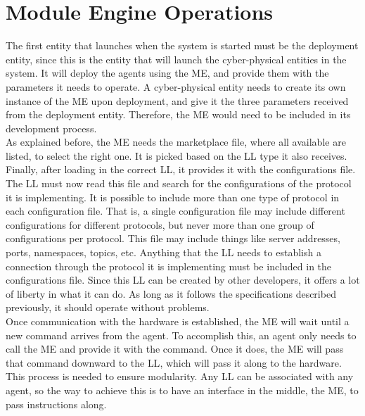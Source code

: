 \section{Module Engine Operations}
\label{sec:module_engine_operations}

The first entity that launches when the system is started must be the deployment entity, since this is the entity that will launch the cyber-physical entities in the system. It will deploy the agents using the \acrlong{ME}, and provide them with the parameters it needs to operate. A cyber-physical entity needs to create its own instance of the \acrshort{ME} upon deployment, and give it the three parameters received from the deployment entity. Therefore, the \acrshort{ME} would need to be included in its development process.\\

As explained before, the \acrshort{ME} needs the marketplace file, where all available  are listed, to select the right one. It is picked based on the \acrshort{LL} type it also receives. Finally, after loading in the correct \acrshort{LL}, it provides it with the configurations file.\\

The \acrlong{LL} must now read this file and search for the configurations of the protocol it is implementing. It is possible to include more than one type of protocol in each configuration file. That is, a single configuration file may include different configurations for different protocols, but never more than one group of configurations per protocol. This file may include things like server addresses, ports, namespaces, topics, etc. Anything that the \acrshort{LL} needs to establish a connection through the protocol it is implementing must be included in the configurations file. Since this \acrshort{LL} can be created by other developers, it offers a lot of liberty in what it can do. As long as it follows the specifications described previously, it should operate without problems.\\

Once communication with the hardware is established, the \acrlong{ME} will wait until a new command arrives from the agent. To accomplish this, an agent only needs to call the \acrshort{ME} and provide it with the command. Once it does, the \acrshort{ME} will pass that command downward to the \acrshort{LL}, which will pass it along to the hardware. This process is needed to ensure modularity. Any \acrshort{LL} can be associated with any agent, so the way to achieve this is to have an interface in the middle, the \acrlong{ME}, to pass instructions along.\\


